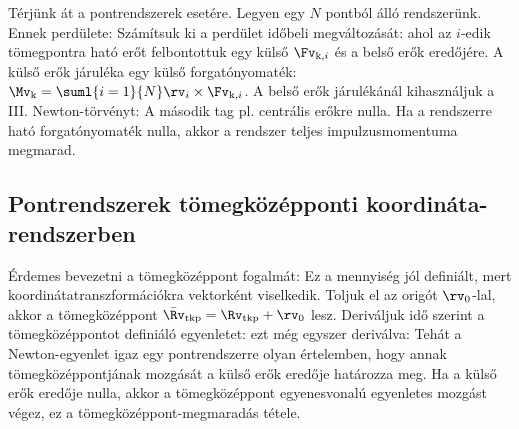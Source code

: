    Térjünk át a pontrendszerek esetére.
   Legyen egy $N$ pontból álló rendszerünk.
   Ennek perdülete:
   Számítsuk ki a perdület időbeli megváltozását:
   ahol az $i$-edik tömegpontra ható erőt felbontottuk egy külső $\Fv_{\text{k},i}$ és a belső erők eredőjére.
   A külső erők járuléka egy külső forgatónyomaték: $\Mv_\text{k}=\suml{i=1}{N}\rv_i\times\Fv_{\text{k},i}$.
   A belső erők járulékánál kihasználjuk a III.
   Newton-törvényt:
   A második tag pl. centrális erőkre nulla.
   Ha a rendszerre ható forgatónyomaték nulla, akkor a rendszer teljes impulzusmomentuma megmarad. 
  
  \subsection{Pontrendszerek tömegközépponti koordináta-rendszerben}
   
   Érdemes bevezetni a tömegközéppont fogalmát:
   Ez a mennyiség jól definiált, mert koordinátatranszformációkra vektorként viselkedik.
   Toljuk el az origót $\rv_0$-lal, akkor a tömegközéppont $\bar{\Rv}_\text{tkp}={\Rv}_\text{tkp}+\rv_0$ lesz.
   Deriváljuk idő szerint a tömegközéppontot definiáló egyenletet:
   ezt még egyszer deriválva: 
   Tehát a Newton-egyenlet igaz egy pontrendszerre olyan értelemben, hogy annak tömegközéppontjának mozgását a külső erők eredője határozza meg.
   Ha a külső erők eredője nulla, akkor a tömegközéppont egyenesvonalú egyenletes mozgást végez, ez a tömegközéppont-megmaradás tétele. 
   
